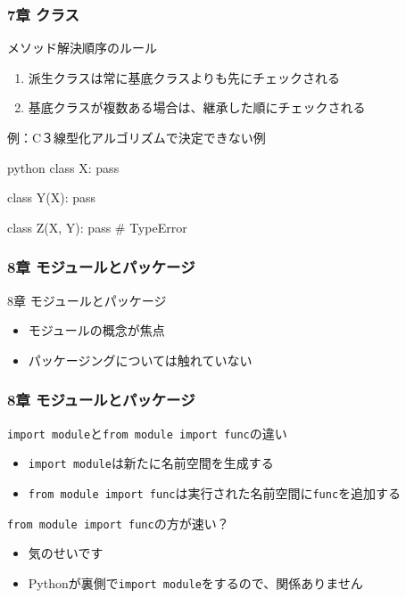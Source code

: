 \documentclass[aspectratio=169,dvipdfmx,12pt,notheorems]{beamer}
\theoremstyle{definition}
\begin{document}
\begin{frame}[fragile]\frametitle{7章 クラス}

\begin{block}{メソッド解決順序のルール}
\begin{enumerate}
\item 派生クラスは常に基底クラスよりも先にチェックされる
\item 基底クラスが複数ある場合は、継承した順にチェックされる
\end{enumerate}
\end{block}

\begin{alertblock}{例：C３線型化アルゴリズムで決定できない例}
\begin{pygments}{python}    
class X:
    pass
    
class Y(X):
    pass
    
class Z(X, Y):
    pass  # TypeError
\end{pygments}
\end{alertblock}

\end{frame}

\begin{frame}\frametitle{8章 モジュールとパッケージ}

\begin{block}{8章 モジュールとパッケージ}
\begin{itemize}
\item モジュールの概念が焦点
\item パッケージングについては触れていない
\end{itemize}
\end{block}

\end{frame}

\begin{frame}\frametitle{8章 モジュールとパッケージ}

\begin{block}{\texttt{import module}と\texttt{from module import func}の違い}
\begin{itemize}
\item \texttt{import module}は新たに名前空間を生成する
\item \texttt{from module import func}は実行された名前空間に\texttt{func}を追加する
\end{itemize}
\end{block}

\begin{alertblock}{\texttt{from module import func}の方が速い？}
\begin{itemize}
\item 気のせいです
\item Pythonが裏側で\texttt{import module}をするので、関係ありません
\end{itemize}
\end{alertblock}

\end{frame}
\end{document}
